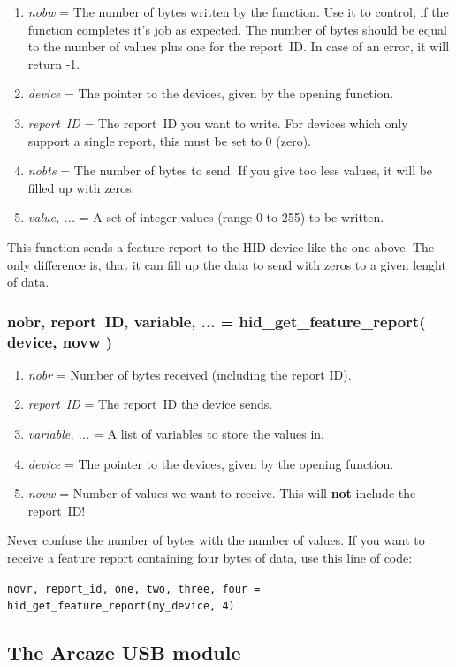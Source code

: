\documentclass[11pt,parskip=half,a4paper]{scrartcl}
\begin{document}
\begin{enumerate}
\item \emph{nobw} = The number of bytes written by the function. Use it to control, if the function completes it's job as expected. The number of bytes should be equal to the number of values plus one for the report~ID. In case of an error, it will return -1.
\item \emph{device} = The pointer to the devices, given by the opening function.
\item \emph{report~ID} = The report~ID you want to write. For devices which only support a single report, this must be set to 0 (zero).
\item \emph{nobts} = The number of bytes to send. If you give too less values, it will be filled up with zeros.
\item \emph{value, ...} = A set of integer values (range 0 to 255) to be written.
\end{enumerate}

This function sends a feature report to the HID device like the one above. The only difference is, that it can fill up the data to send with zeros to a given lenght of data.

\subsubsection{nobr, report~ID, variable, ... = hid\_get\_feature\_report( device, novw )}

\begin{enumerate}
\item \emph{nobr} = Number of bytes received (including the report ID).
\item \emph{report~ID} = The report~ID the device sends.
\item \emph{variable, ...} = A list of variables to store the values in.
\item \emph{device} = The pointer to the devices, given by the opening function.
\item \emph{novw} = Number of values we want to receive. This will \textbf{not} include the report~ID!
\end{enumerate}

Never confuse the number of bytes with the number of values. If you want to receive a feature report containing four bytes of data, use this line of code:

\verb|novr, report_id, one, two, three, four = hid_get_feature_report(my_device, 4)|

\subsection{The Arcaze USB module}
\end{document}

